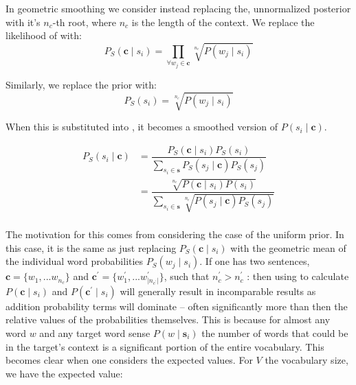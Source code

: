 \documentclass{sig-alternate}
\renewcommand{\c}{\mathbf{c}}
\newcommand{\s}{\mathbf{s}}
\begin{document}
In geometric smoothing we consider instead replacing the, unnormalized posterior  with it's $n_c$-th root, where $n_c$ is the length of the context.
We replace the likelihood of  with:
\begin{equation} \label{eq:contrextprobsmooth}
P_S(\c \mid s_{i})=\prod_{\forall w_{j}\in\c}\sqrt[n_c]{P(w_{j} \mid s_{i})}
\end{equation}

Similarly, we replace the prior with:
\begin{equation} \label{eq:priorsmoothed}
P_S(s_{i})= \sqrt[n_c]{P(w_{j} \mid s_{i})}
\end{equation}


When this is substituted into , it becomes a smoothed version of $P(s_{i} \mid \c)$.


\begin{equation} \label{eq:generalwsdsmoothed}
\begin{aligned}
P_S(s_{i}\mid\c) %
&=\dfrac{P_{S}(\c\mid s_{i})P_S(s_{i})}
{\sum_{s_{i}\in\s} P_{S}(s_{j}\mid\c) P_S(s_{j})} \\
%
&=\dfrac{\sqrt[n_c]{P(\c\mid s_{i})P(s_{i})}}
{\sum_{s_{i}\in\s} \sqrt[n_c]{P(s_{j}\mid\c)P_S(s_{j})}} \\
%
\end{aligned}
\end{equation}

The motivation for this comes from considering the case of the uniform prior.
In this case, it is the same as just replacing $P_S(\c \mid s_{i})$ with the geometric mean of the individual word probabilities $P_S(w_j \mid s_{i})$.
If one has two sentences, $\c=\{w_1,...w_{n_c}\}$ and $\c^\prime=\{w_1^\prime,...w^\prime_{|n_{c^\prime}|}\}$, such that $n_c^\prime > n_c^\prime$ :
then using  to calculate $P(\c \mid s_{i})$ and $P(\c^\prime \mid s_{i})$ will generally result in incomparable results as addition probability terms will dominate -- often significantly more than then the relative values of the probabilities themselves. This is because for almost any word $w$ and any target word sense $P(w \mid \s_i)$ the number of words that could be in the target's context is a significant portion of the entire vocabulary.
This becomes clear when one considers the expected values. For $V$ the vocabulary size, we have the expected value:
\end{document}
